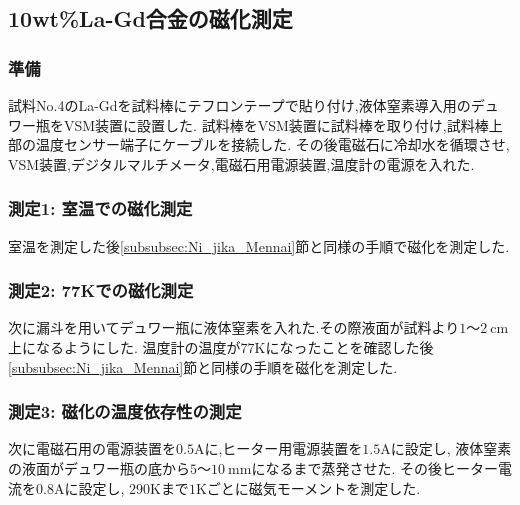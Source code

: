 \subsection{10wt\%La-Gd合金の磁化測定}
\subsubsection{準備}
試料No.4のLa-Gdを試料棒にテフロンテープで貼り付け,液体窒素導入用のデュワー瓶をVSM装置に設置した.
試料棒をVSM装置に試料棒を取り付け,試料棒上部の温度センサー端子にケーブルを接続した.
その後電磁石に冷却水を循環させ, VSM装置,デジタルマルチメータ,電磁石用電源装置,温度計の電源を入れた.
\subsubsection{測定1: 室温での磁化測定}
室温を測定した後\ref{subsubsec:Ni_jika_Mennai}節と同様の手順で磁化を測定した.
\subsubsection{測定2: 77Kでの磁化測定}
次に漏斗を用いてデュワー瓶に液体窒素を入れた.その際液面が試料より$1〜2\ \si{\centi\metre}$上になるようにした.
温度計の温度が$77\si{\kelvin}$になったことを確認した後\ref{subsubsec:Ni_jika_Mennai}節と同様の手順を磁化を測定した.
\subsubsection{測定3: 磁化の温度依存性の測定}
次に電磁石用の電源装置を$0.5\si{\ampere}$に,ヒーター用電源装置を$1.5\si{\ampere}$に設定し,
液体窒素の液面がデュワー瓶の底から$5〜10\ \si{\milli\metre}$になるまで蒸発させた.
その後ヒーター電流を$0.8\si{\ampere}$に設定し, $290\si{\kelvin}$まで$1\si{\kelvin}$ごとに磁気モーメントを測定した.